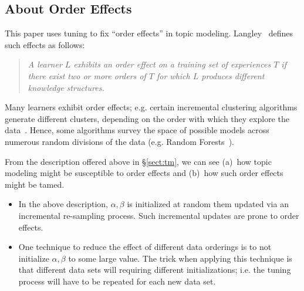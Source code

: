 \documentclass[10pt,conference]{IEEEtran}
\newcommand{\bi}{\begin{itemize}}
\newcommand{\ei}{\end{itemize}}
\theoremstyle{break}
\begin{document}
\subsection{About Order Effects}

\noindent
This paper uses tuning to fix ``order effects'' in topic modeling. Langley~\cite{GENNARI198911} defines such effects as follows:
\begin{quote}
{\em A learner $L$ exhibits an order effect on a training set of experiences $T$ if there exist
two or more orders of $T$ for which $L$ produces different knowledge structures.}
\end{quote}
Many learners exhibit order effects; e.g. certain incremental clustering algorithms generate different
clusters, depending on the order with which they explore the data~\cite{GENNARI198911}.
Hence, some algorithms survey the space of possible models across numerous
random divisions of the data (e.g. Random Forests~\cite{Breiman2001}).

From the description offered above in \S\ref{sect:tm},
we can see (a)~how topic modeling might be susceptible to order effects and (b)~how such order
effects might be tamed.
\bi
\item
  In the above description,  $\alpha,\beta$ is initialized at random
them updated via an incremental re-sampling process. Such incremental updates are prone to order effects.
\item
  One technique to reduce the effect of different data orderings is to not initialize $\alpha,\beta$ to some
  large value. The trick when applying this technique is that different data sets will requiring different
  initializations; i.e. the tuning process will have to be repeated for each new data set.
\ei
  





\end{document}
